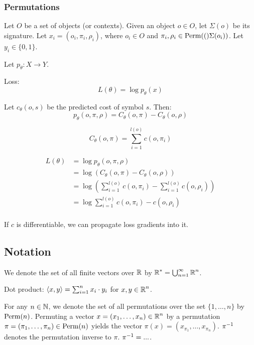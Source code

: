 \subsubsection{Permutations}

Let $O$ be a set of objects (or contexts).
Given an object $o \in O$, let $\Sigma(o)$ be its signature.
Let $x_i = (o_i, \pi_i, \rho_i)$, where $o_i \in O$
and $\pi_i, \rho_i \in \mathrm{Perm}(()\Sigma(o_i))$.
Let $y_i \in \{0, 1\}$.

Let $p_\theta: X \to Y$.

Loss:
$$
L(\theta) = \log{p_\theta(x)}
$$

Let $c_\theta(o, s)$ be the predicted cost of symbol $s$.
Then:
$$
p_\theta(o, \pi, \rho) = C_\theta(o, \pi) - C_\theta(o, \rho)
$$

$$
C_\theta(o, \pi) = \sum_{i=1}^{l(o)}{c(o, \pi_i)}
$$

\begin{align*}
L(\theta) &= \log{p_\theta(o, \pi, \rho)} \\
&= \log{(C_\theta(o, \pi) - C_\theta(o, \rho))} \\
&= \log{(\sum_{i=1}^{l(o)}{c(o, \pi_i)} - \sum_{i=1}^{l(o)}{c(o, \rho_i)})} \\
&= \log{\sum_{i=1}^{l(o)}{c(o, \pi_i) - c(o, \rho_i)}} \\
\end{align*}

If $c$ is differentiable,
we can propagate loss gradients into it.

\subsection{Notation}

We denote the set of all finite vectors over $\operatorname{\mathbb{R}}$ by $\operatorname{\mathbb{R}}^* = \bigcup_{n=1}^\infty{\operatorname{\mathbb{R}}^n}$.

Dot product: $\left<x,y\right> = \sum_{i=1}^n x_i \cdot y_i$ for $x, y \in \operatorname{\mathbb{R}}^n$.

For any $n \in \operatorname{\mathbb{N}}$, we denote the set of all permutations over the set $\{1, \ldots, n\}$ by $\mathrm{Perm}(n)$.
Permuting a vector $x = (x_1, \ldots, x_n) \in \operatorname{\mathbb{R}}^n$ by a permutation $\pi = (\pi_1, \ldots, \pi_n) \in \mathrm{Perm}(n)$ yields the vector $\pi(x) = (x_{\pi_1}, \ldots, x_{\pi_n})$.
$\pi^{-1}$ denotes the permutation inverse to $\pi$.
$\pi^{-1} = ...$.

